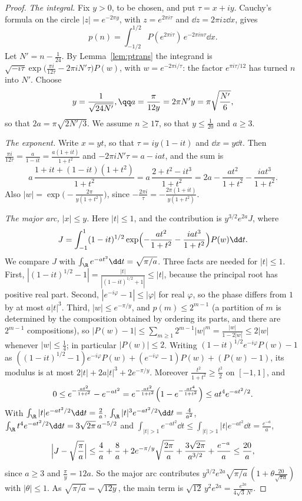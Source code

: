 \begin{proof}
\emph{The integral.} Fix $y>0$, to be chosen, and put $\tau=x+iy$. Cauchy's formula on the circle $|z|=e^{-2\pi y}$, with $z=e^{2\pi i\tau}$ and $\dd z=2\pi iz\dd x$, gives
\[
p(n)=\int_{-1/2}^{1/2}P(e^{2\pi i\tau})\,e^{-2\pi in\tau}\dd x.
\]
Let $N'=n-\frac1{24}$. By Lemma~\ref{lem:ptrans} the integrand is $\sqrt{-i\tau}\exp\bigl(\frac{\pi i}{12\tau}-2\pi iN'\tau\bigr)P(w)$, with $w=e^{-2\pi i/\tau}$: the factor $e^{\pi i\tau/12}$ has turned $n$ into $N'$. Choose
\[
y=\frac1{\sqrt{24N'}},\qq a=\frac\pi{12y}=2\pi N'y=\pi\sqrt{\frac{N'}6},
\]
so that $2a=\pi\sqrt{2N'/3}$. We assume $n\ge17$, so that $y\le\frac1{20}$ and $a\ge3$.

\emph{The exponent.} Write $x=yt$, so that $\tau=iy(1-it)$ and $\dd x=y\dd t$. Then $\frac{\pi i}{12\tau}=\frac{a}{1-it}=\frac{a(1+it)}{1+t^2}$ and $-2\pi iN'\tau=a-iat$, and the sum is
\[
a\,\frac{1+it+(1-it)(1+t^2)}{1+t^2}=a\,\frac{2+t^2-it^3}{1+t^2}=2a-\frac{at^2}{1+t^2}-\frac{iat^3}{1+t^2}.
\]
Also $|w|=\exp\bigl(-\frac{2\pi}{y(1+t^2)}\bigr)$, since $-\frac{2\pi i}\tau=-\frac{2\pi(1+it)}{y(1+t^2)}$.

\emph{The major arc, $|x|\le y$.} Here $|t|\le1$, and the contribution is $y^{3/2}e^{2a}J$, where
\[
J=\int_{-1}^1(1-it)^{1/2}\exp\Bigl(-\frac{at^2}{1+t^2}-\frac{iat^3}{1+t^2}\Bigr)P(w)\dd t.
\]
We compare $J$ with $\int_{\R}e^{-at^2}\dd t=\sqrt{\pi/a}$. Three facts are needed for $|t|\le1$.
First, $|(1-it)^{1/2}-1|=\frac{|t|}{|(1-it)^{1/2}+1|}\le|t|$, because the principal root has positive real part.
Second, $|e^{-i\varphi}-1|\le|\varphi|$ for real $\varphi$, so the phase differs from $1$ by at most $a|t|^3$.
Third, $|w|\le e^{-\pi/y}$, and $p(m)\le2^{m-1}$ (a partition of $m$ is determined by the composition obtained by ordering its parts, and there are $2^{m-1}$ compositions), so $|P(w)-1|\le\sum_{m\ge1}2^{m-1}|w|^m=\frac{|w|}{1-2|w|}\le2|w|$ whenever $|w|\le\frac14$; in particular $|P(w)|\le2$.
Writing $(1-it)^{1/2}e^{-i\varphi}P(w)-1$ as $((1-it)^{1/2}-1)e^{-i\varphi}P(w)+(e^{-i\varphi}-1)P(w)+(P(w)-1)$, its modulus is at most $2|t|+2a|t|^3+2e^{-\pi/y}$. Moreover $\frac{t^2}{1+t^2}\ge\frac{t^2}2$ on $[-1,1]$, and
\[
0\le e^{-\frac{at^2}{1+t^2}}-e^{-at^2}=e^{-\frac{at^2}{1+t^2}}\Bigl(1-e^{-\frac{at^4}{1+t^2}}\Bigr)\le at^4e^{-at^2/2}.
\]
With $\int_{\R}|t|e^{-at^2/2}\dd t=\frac2a$, $\int_{\R}|t|^3e^{-at^2/2}\dd t=\frac4{a^2}$, $\int_\R t^4e^{-at^2/2}\dd t=3\sqrt{2\pi}\,a^{-5/2}$ and $\int_{|t|>1}e^{-at^2}\dd t\le\int_{|t|>1}|t|e^{-at^2}\dd t=\frac{e^{-a}}a$,
\[
\Bigl|J-\sqrt{\frac\pi a}\Bigr|\le\frac4a+\frac8a+2e^{-\pi/y}\sqrt{\frac{2\pi}a}+\frac{3\sqrt{2\pi}}{a^{3/2}}+\frac{e^{-a}}a\le\frac{20}a,
\]
since $a\ge3$ and $\frac\pi y=12a$.
So the major arc contributes $y^{3/2}e^{2a}\sqrt{\pi/a}\,(1+\theta\frac{20}{\sqrt{\pi a}})$ with $|\theta|\le1$. As $\sqrt{\pi/a}=\sqrt{12y}$, the main term is $\sqrt{12}\,y^2e^{2a}=\frac{e^{2a}}{4\sqrt3\,N'}$.


\end{proof}
